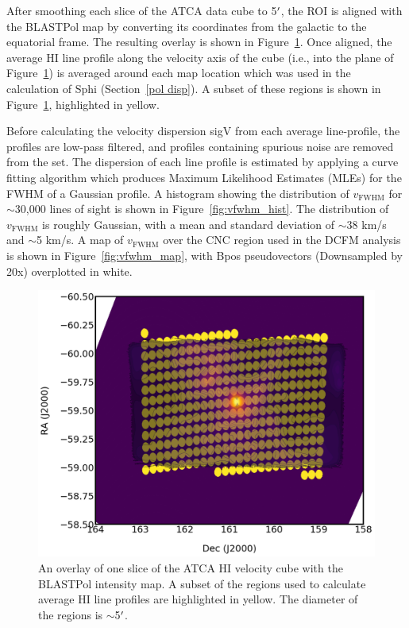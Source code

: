 After smoothing each slice of the ATCA data cube to 5$\operatorname{^{\prime}}$, the ROI is aligned with the BLASTPol map by converting its coordinates from the galactic to the equatorial frame. The resulting overlay is shown in Figure~\ref{fig:HI_vselect}. Once aligned, the average $\mathrm{HI}$ line profile along the velocity axis of the cube (i.e., into the plane of Figure~\ref{fig:HI_vselect}) is averaged around each map location which was used in the calculation of \gls{Sphi} (Section~\ref{pol disp}). A subset of these regions is shown in Figure~\ref{fig:HI_vselect}, highlighted in yellow.

Before calculating the velocity dispersion \gls{sigV} from each average line-profile, the profiles are low-pass filtered, and profiles containing spurious noise are removed from the set. The dispersion of each line profile is estimated by applying a curve fitting algorithm which produces Maximum Likelihood Estimates (MLEs) for the FWHM of a Gaussian profile. A histogram showing the distribution of $v_{\mathrm{FWHM}}$ for $\sim$30,000 lines of sight is shown in Figure~\ref{fig:vfwhm_hist}. The distribution of $v_{\mathrm{FWHM}}$ is roughly Gaussian, with a mean and standard deviation of $\sim$38 km/s and $\sim$5 km/s. A map of $v_{\mathrm{FWHM}}$ over the CNC region used in the DCFM analysis is shown in Figure~\ref{fig:vfwhm_map}, with \gls{Bpos} pseudovectors (Downsampled by 20x) overplotted in white.

\begin{figure}[!htbp]
\centering
\includegraphics[width=\textwidth]{figures/carina/HI_vselect}
\caption[An overlay of one slice of the ATCA HI velocity cube with the BLASTPol intensity map.]{An overlay of one slice of the ATCA $\mathrm{HI}$ velocity cube with the BLASTPol intensity map. A subset of the regions used to calculate average HI line profiles are highlighted in yellow. The diameter of the regions is $\sim$5$\operatorname{^{\prime}}$.}
\label{fig:HI_vselect}
\end{figure}

